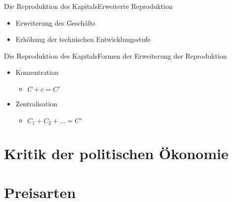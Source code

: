 \documentclass[10pt,a4paper, ngerman]{beamer}
\begin{document}
\begin{frame}{Die Reproduktion des Kapitals}{Erweiterte Reproduktion}
\begin{itemize}
	\item Erweiterung des Geschäfts
	\item Erhöhung der technischen Entwicklungsstufe
\end{itemize}
\end{frame}

\begin{frame}{Die Reproduktion des Kapitals}{Formen der Erweiterung der Reproduktion}
\begin{itemize}
	\item Konzentration
	\begin{itemize}
		\item \(C+c=C'\)
	\end{itemize} \pause
	\item Zentralisation
	\begin{itemize}
		\item \(C_{1}+C_{2}+\ldots =C'\)
	\end{itemize}
\end{itemize}
\end{frame}

\section{Kritik der politischen Ökonomie}

\section{Preisarten}
\end{document}
